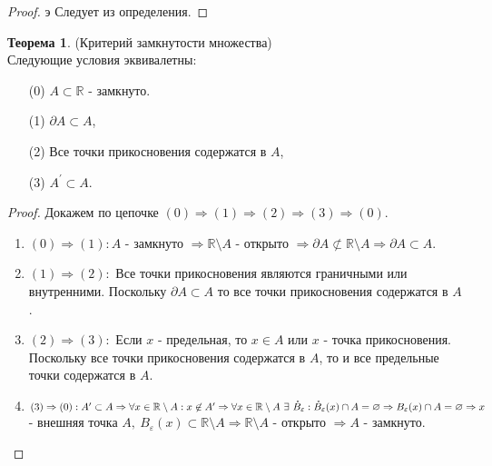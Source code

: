 \documentclass[a4paper, 12pt]{article}
\newcommand{\R}{\mathbb{R}}
\renewcommand{\epsilon}{\varepsilon}
\renewcommand{\emptyset}{\varnothing}
\theoremstyle{definition}
\newtheorem*{theorem}{Теорема}
\begin{document}
        \begin{proof}э
            Следует из определения.
        \end{proof} 
        \begin{theorem} (Критерий замкнутости множества)\\
            Следующие условия эквивалетны:
            \begin{itemize}
                \item[(0)] $A\subset \R$ - замкнуто. 
                \item[(1)] $\partial A\subset A$,
                \item[(2)] Все точки прикосновения содержатся в $A$,
                \item[(3)] $A^{\prime}\subset A$.
            \end{itemize}
            \begin{proof}
                Докажем по цепочке $(0)\Rightarrow (1)\Rightarrow (2)\Rightarrow (3)\Rightarrow (0)$.\\
                \begin{enumerate}
                    \item $(0)\Rightarrow (1):A$ - замкнуто $\Rightarrow \R\setminus A$ - открыто $\Rightarrow \partial A \not\subset\R\setminus A \Rightarrow \partial A\subset A$.
                    \item $(1)\Rightarrow (2):$ Все точки прикосновения являются граничными или внутренними. Поскольку $\partial A\subset A$ то все точки прикосновения содержатся в $A$.
                    \item $(2)\Rightarrow (3):$ Если $x$ - предельная, то $x\in A$ или $x$ - точка прикосновения. Поскольку все точки прикосновения содержатся в $A$, то и все предельные точки содержатся в $A$.
                    \item $(3)\Rightarrow (0): A^{\prime}\subset A\Rightarrow \forall x\in \R\setminus A: x\not\in A^{\prime}\Rightarrow \forall x\in\R\setminus A\ \exists\ \mathring{B}_{\epsilon}: \mathring{B}_{\epsilon}(x)\cap A=\emptyset\\
                    \Rightarrow B_{\epsilon}(x)\cap A=\emptyset \Rightarrow x$ - внешняя точка $A,\ B_{\epsilon}(x)\subset\R\setminus A\Rightarrow \R\setminus A$ - открыто $\Rightarrow A$ - замкнуто. 
                \end{enumerate}
            \end{proof} 
        \end{theorem}
\end{document}
